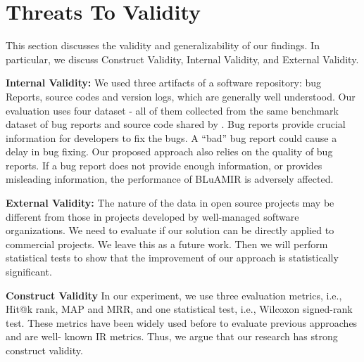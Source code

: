 \documentclass[conference]{IEEEtran}
\begin{document}


\section{Threats To Validity}\label{sec:threats}
This section discusses the validity and generalizability of our findings. In particular, we discuss Construct Validity, Internal Validity, and External Validity.

\textbf{Internal Validity:} We used three artifacts of a software repository: bug Reports, source codes and version logs, which are generally well understood. Our evaluation uses four dataset - all of them collected from the same benchmark dataset of bug reports and source code shared by \citet{Jian}. Bug reports provide crucial information for developers to fix the bugs. A “bad” bug report could cause a delay in bug fixing. Our proposed approach also relies on the quality of bug reports. If a bug report does not provide enough information, or provides misleading information, the performance of BLuAMIR is adversely affected.

\textbf{External Validity:} 
The nature of the data in open source projects may be different from those in projects developed by well-managed software organizations. We need to evaluate if our solution can be directly applied to commercial projects. We leave this as a future work. Then we will perform statistical tests to show that the improvement of our approach is statistically significant.

\textbf{Construct Validity}
In our experiment, we use three evaluation metrics, i.e., Hit@k rank, MAP and MRR, and one statistical test, i.e., Wilcoxon signed-rank test. These metrics have been widely used before to evaluate previous approaches \cite{Jian, Saha} and are well- known IR metrics. Thus, we argue that our research has strong construct validity.
\end{document}
